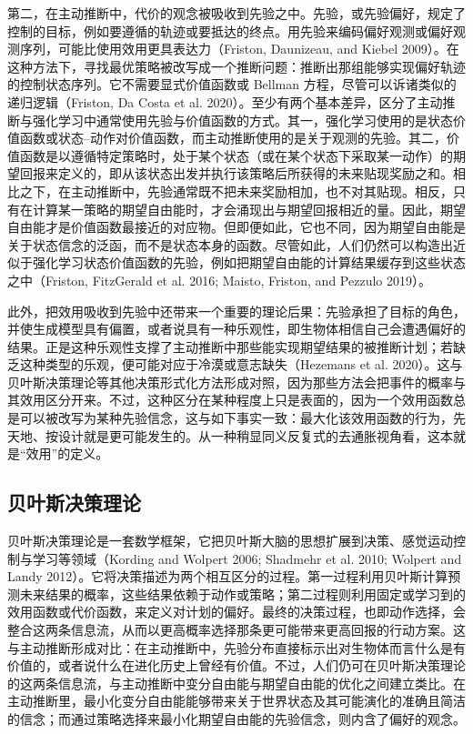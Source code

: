 第二，在主动推断中，代价的观念被吸收到先验之中。先验，或先验偏好，规定了控制的目标，例如要遵循的轨迹或要抵达的终点。用先验来编码偏好观测或偏好观测序列，可能比使用效用更具表达力（Friston, Daunizeau, and Kiebel 2009）。在这种方法下，寻找最优策略被改写成一个推断问题：推断出那组能够实现偏好轨迹的控制状态序列。它不需要显式价值函数或 Bellman 方程，尽管可以诉诸类似的递归逻辑（Friston, Da Costa et al. 2020）。至少有两个基本差异，区分了主动推断与强化学习中通常使用先验与价值函数的方式。其一，强化学习使用的是状态价值函数或状态--动作对价值函数，而主动推断使用的是关于观测的先验。其二，价值函数是以遵循特定策略时，处于某个状态（或在某个状态下采取某一动作）的期望回报来定义的，即从该状态出发并执行该策略后所获得的未来贴现奖励之和。相比之下，在主动推断中，先验通常既不把未来奖励相加，也不对其贴现。相反，只有在计算某一策略的期望自由能时，才会涌现出与期望回报相近的量。因此，期望自由能才是价值函数最接近的对应物。但即便如此，它也不同，因为期望自由能是关于状态信念的泛函，而不是状态本身的函数。尽管如此，人们仍然可以构造出近似于强化学习状态价值函数的先验，例如把期望自由能的计算结果缓存到这些状态之中（Friston, FitzGerald et al. 2016; Maisto, Friston, and Pezzulo 2019）。

此外，把效用吸收到先验中还带来一个重要的理论后果：先验承担了目标的角色，并使生成模型具有偏置，或者说具有一种乐观性，即生物体相信自己会遭遇偏好的结果。正是这种乐观性支撑了主动推断中那些能实现期望结果的被推断计划；若缺乏这种类型的乐观，便可能对应于冷漠或意志缺失（Hezemans et al. 2020）。这与贝叶斯决策理论等其他决策形式化方法形成对照，因为那些方法会把事件的概率与其效用区分开来。不过，这种区分在某种程度上只是表面的，因为一个效用函数总是可以被改写为某种先验信念，这与如下事实一致：最大化该效用函数的行为，先天地、按设计就是更可能发生的。从一种稍显同义反复式的去通胀视角看，这本就是“效用”的定义。

\subsection{贝叶斯决策理论}\label{sec:bayesian-decision-theory}

贝叶斯决策理论是一套数学框架，它把贝叶斯大脑的思想扩展到决策、感觉运动控制与学习等领域（Kording and Wolpert 2006; Shadmehr et al. 2010; Wolpert and Landy 2012）。它将决策描述为两个相互区分的过程。第一过程利用贝叶斯计算预测未来结果的概率，这些结果依赖于动作或策略；第二过程则利用固定或学习到的效用函数或代价函数，来定义对计划的偏好。最终的决策过程，也即动作选择，会整合这两条信息流，从而以更高概率选择那条更可能带来更高回报的行动方案。这与主动推断形成对比：在主动推断中，先验分布直接标示出对生物体而言什么是有价值的，或者说什么在进化历史上曾经有价值。不过，人们仍可在贝叶斯决策理论的这两条信息流，与主动推断中变分自由能与期望自由能的优化之间建立类比。在主动推断里，最小化变分自由能能够带来关于世界状态及其可能演化的准确且简洁的信念；而通过策略选择来最小化期望自由能的先验信念，则内含了偏好的观念。

